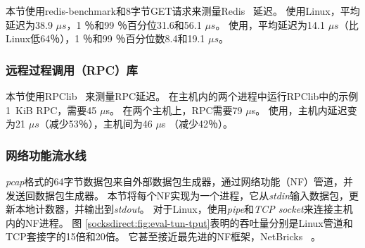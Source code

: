 本节使用redis-benchmark和8字节GET请求来测量Redis~ \cite {redis}延迟。
使用Linux，平均延迟为38.9 $ \mu s $，1 ％和99 ％百分位31.6和56.1 $ \mu s $。
使用\sys {}，平均延迟为14.1 $ \mu s $（比Linux低64％），1 ％和99 ％百分位数8.4和19.1 $ \mu s $。







\subsubsection{远程过程调用（RPC）库}

本节使用RPClib~ \cite {rpclib}来测量RPC延迟。
在主机内的两个进程中运行RPClib中的示例1~KiB RPC，需要45 $ \mu $s。 在两个主机上，RPC需要79 $ \mu$s。
使用\sys {}，主机内延迟变为21 $ \mu s $（减少53％），主机间为46 $ \mu$s （减少42％）。

\subsubsection{网络功能流水线}

\emph {pcap}格式的64字节数据包来自外部数据包生成器，通过网络功能（NF）管道，并发送回数据包生成器。
本节将每个NF实现为一个进程，它从\emph {stdin}输入数据包，更新本地计数器，并输出到\emph {stdout}。
对于Linux，使用\emph {pipe}和\emph {TCP socket}来连接主机内的NF进程。
图 \ref {socksdirect:fig:eval-tun-tput}表明\sys {}的吞吐量分别是Linux管道和TCP套接字的15倍和20倍。
它甚至接近最先进的NF框架，NetBricks~ \cite {panda2016netbricks}。

